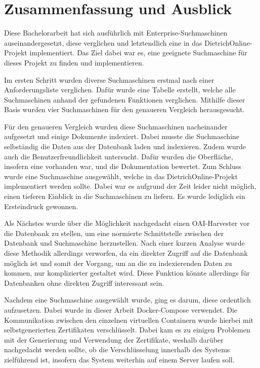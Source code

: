 \chapter{Zusammenfassung und Ausblick}

Diese Bachelorarbeit hat sich ausführlich mit Enterprise-Suchmaschinen auseinandergesetzt, diese verglichen und letztendlich eine in das DietrichOnline-Projekt implementiert. Das Ziel dabei war es, eine geeignete Suchmaschine für dieses Projekt zu finden und implementieren.  

Im ersten Schritt wurden diverse Suchmaschinen erstmal nach einer Anforderungsliste verglichen. Dafür wurde eine Tabelle erstellt, welche alle Suchmaschinen anhand der gefundenen Funktionen verglichen. Mithilfe dieser Basis wurden vier Suchmaschinen für den genaueren Vergleich herausgesucht.

Für den genaueren Vergleich wurden diese Suchmaschinen nacheinander aufgesetzt und einige Dokumente indexiert. Dabei musste die Suchmaschine selbständig die Daten aus der Datenbank laden und indexieren. Zudem wurde auch die Benutzerfreundlichkeit untersucht. Dafür wurden die Oberfläche, insofern eine vorhanden war, und die Dokumentation bewertet. Zum Schluss wurde eine Suchmaschine ausgewählt, welche in das DietrichOnline-Projekt implementiert werden sollte. Dabei war es aufgrund der Zeit leider nicht möglich, einen tieferen Einblick in die Suchmaschinen zu liefern. Es wurde lediglich ein Ersteindruck gewonnen.

Als Nächstes wurde über die Möglichkeit nachgedacht einen OAI-Harvester vor die Datenbank zu stellen, um eine normierte Schnittstelle zwischen der Datenbank und Suchmaschine herzustellen. Nach einer kurzen Analyse wurde diese Methodik allerdings verworfen, da ein direkter Zugriff auf die Datenbank möglich ist und somit der Vorgang, um an die zu indexierenden Daten zu kommen, nur komplizierter gestaltet wird. Diese Funktion könnte allerdings für Datenbanken ohne direkten Zugriff interessant sein. 

Nachdem eine Suchmaschine ausgewählt wurde, ging es darum, diese ordentlich aufzusetzen. Dabei wurde in dieser Arbeit Docker-Compose verwendet. Die Kommunikation zwischen den einzelnen virtuellen Containern wurde hierbei mit selbstgenerierten Zertifikaten verschlüsselt. Dabei kam es zu einigen Problemen mit der Generierung und Verwendung der Zertifikate, weshalb darüber nachgedacht werden sollte, ob die Verschlüsselung innerhalb des Systems zielführend ist, insofern das System weiterhin auf einem Server laufen soll. 

